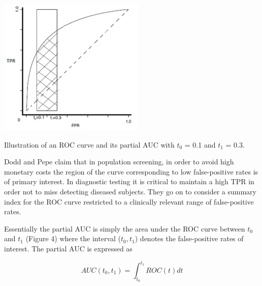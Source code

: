 \documentclass[a4paper,justified]{tufte-handout}
\begin{document}
\begin{fullwidth}
\end{fullwidth}

\begin{marginfigure}[7.0cm]
	\includegraphics[width=\linewidth]{roc_curves/Figure4.png}
	\caption{Illustration of an ROC curve and its partial AUC with $t_{0}$ = 0.1 and $t_{1}$ = 0.3.}
\end{marginfigure}

\vspace{3mm}
\noindent Dodd and Pepe \citep{dodd2003pauc} claim that in population screening, in order to avoid high monetary costs the region of the curve corresponding to low false-positive rates is of primary interest. In diagnostic testing it is critical to maintain a high TPR in order not to miss detecting diseased subjects. They go on to consider a summary index for the ROC curve restricted to a clinically relevant range of false-positive rates.

\vspace{3mm}
\noindent Essentially the partial AUC is simply the area under the ROC curve between $t_{0}$ and $t_{1}$ (Figure 4) where the interval ($t_{0},t_{1}$) denotes the false-positive rates of interest. The partial AUC is expressed as

\[AUC(t_{0},t_{1}) = \int_{t_{0}}^{t_{1}} ROC(t)  dt\]
\end{document}
